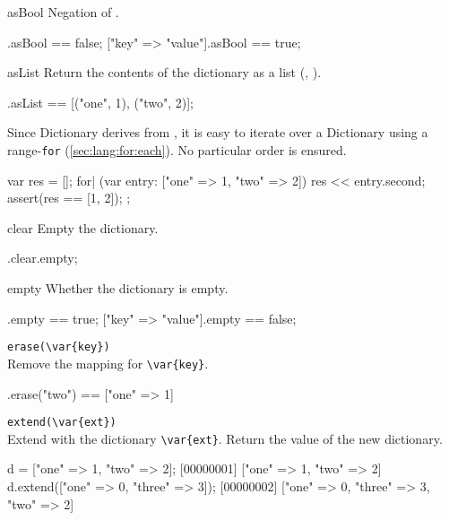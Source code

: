 \begin{urbiscriptapi}
\item[asBool]
  Negation of .
\begin{urbiassert}
[=>].asBool == false;
["key" => "value"].asBool == true;
\end{urbiassert}

\item[asList]
  Return the contents of the dictionary as a  list
  (, ).

\begin{urbiassert}
["one" => 1, "two" => 2].asList == [("one", 1), ("two", 2)];
\end{urbiassert}

  \noindent
  Since Dictionary derives from , it is easy
  to iterate over a Dictionary using a range-\lstinline|for|
  (\autoref{sec:lang:for:each}).  No particular order is ensured.
\begin{urbiscript}
{
  var res = [];
  for| (var entry: ["one" => 1, "two" => 2])
    res << entry.second;
  assert(res == [1, 2]);
};
\end{urbiscript}

\item[clear]
  Empty the dictionary.

\begin{urbiassert}
["one" => 1].clear.empty;
\end{urbiassert}

\item[empty]
  Whether the dictionary is empty.

\begin{urbiassert}
[=>].empty == true;
["key" => "value"].empty == false;
\end{urbiassert}

\item \lstinline|erase(\var{key})|\\
  Remove the mapping for \lstinline|\var{key}|.

\begin{urbiassert}
["one" => 1, "two" => 2].erase("two") == ["one" => 1]
\end{urbiassert}

\item \lstinline|extend(\var{ext})|\\
  Extend with the dictionary \lstinline|\var{ext}|.
  Return the value of the new dictionary.
\begin{urbiscript}
d = ["one" => 1, "two" => 2];
[00000001] ["one" => 1, "two" => 2]
d.extend(["one" => 0, "three" => 3]);
[00000002] ["one" => 0, "three" => 3, "two" => 2]
\end{urbiscript}



\end{urbiscriptapi}

